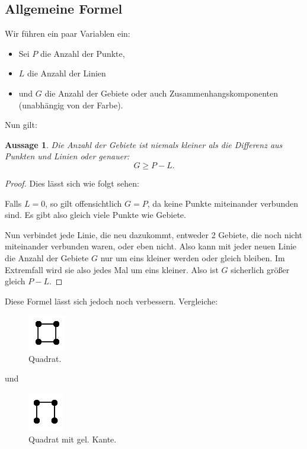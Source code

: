 \documentclass[11pt,a4paper]{article}
\numberwithin{equation}{section}
\numberwithin{table}{section}
\numberwithin{figure}{section}
\newtheorem{aussage}[satz]{Aussage}
\begin{document}
\subsection{Allgemeine Formel}

Wir führen ein paar Variablen ein:
\begin{itemize}
\item Sei $P$ die Anzahl der Punkte,
\item  $L$ die Anzahl der Linien
\item  und $G$ die Anzahl der Gebiete oder auch Zusammenhangskomponenten (unabhängig von der Farbe).
\end{itemize}
Nun gilt: 
\begin{aussage} 
Die Anzahl der Gebiete ist niemals kleiner als die Differenz aus Punkten und Linien oder genauer:
$$G\geq P-L.$$
\end{aussage}
\begin{proof}
Dies lässt sich wie folgt sehen:\par\noindent
Falls $L=0$, so gilt offensichtlich $G=P$, da keine Punkte miteinander verbunden sind. Es gibt also gleich viele Punkte wie Gebiete.\par\noindent
Nun verbindet jede Linie, die neu dazukommt, entweder 2 Gebiete, die noch nicht miteinander verbunden waren, oder eben nicht. Also kann mit jeder neuen Linie die Anzahl der Gebiete $G$ nur um eins kleiner werden oder gleich bleiben. Im Extremfall wird sie also jedes Mal um eins kleiner. Also ist $G$ sicherlich größer gleich $P-L$.
\end{proof} \par\noindent
Diese Formel lässt sich jedoch noch verbessern. Vergleiche: \par\noindent 
\begin{minipage}{0.4\textwidth}
\begin{figure}[H]\label{bild3}
\begin{center}
\includegraphics[scale=1]{3}
\caption{Quadrat.}
\end{center}
\end{figure} 
\end{minipage}
\begin{minipage}{0.2\textwidth}
und
\end{minipage}
\begin{minipage}{0.4\textwidth}
\begin{figure}[H]\label{bild4}
\begin{center}
\includegraphics[scale=1]{4}
\caption{Quadrat mit gel. Kante.}
\end{center}
\end{figure} 
\end{minipage}
\end{document}
